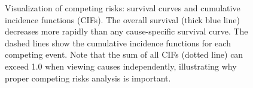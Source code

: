 \begin{figure}[htbp]
    \caption{Visualization of competing risks: survival curves and cumulative incidence functions (CIFs). The overall survival (thick blue line) decreases more rapidly than any cause-specific survival curve. The dashed lines show the cumulative incidence functions for each competing event. Note that the sum of all CIFs (dotted line) can exceed 1.0 when viewing causes independently, illustrating why proper competing risks analysis is important.}
    \label{fig:competing-risks}
\end{figure}
